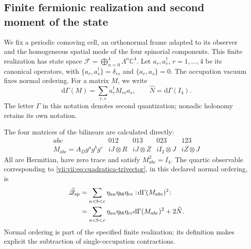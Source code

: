 \subsection{Finite fermionic realization and second moment of the state}
\label{vii:vii:subsec:segundo-momento-car}

We fix a periodic comoving cell, an orthonormal frame adapted to its
observer and the homogeneous spatial mode of the four spinorial
components. This finite realization has state space
\(\mathcal F=\bigoplus_{n=0}^4\Lambda^n\mathbb C^4\).
Let \(a_r,a_r^\dagger\), \(r=1,\ldots,4\) be its canonical
operators, with
\(\{a_r,a_s^\dagger\}=\delta_{rs}\) and
\(\{a_r,a_s\}=0\). The occupation vacuum fixes normal
ordering. For a matrix \(M\), we write
\[
 \mathrm d\Gamma(M)=\sum_{r,s}a_r^\dagger M_{rs}a_s,
 \qquad \widehat N=\mathrm d\Gamma(I_4).
\]
The letter \(\Gamma\) in this notation denotes second
quantization; nonadic holonomy retains its own notation.

The four matrices of the bilinears are calculated directly:
\begin{equation}
 \begin{array}{c|cccc}
 abc&012&013&023&123\\ \hline
 M_{abc}=A_Dg^ag^bg^c
       &iJ\otimes R&iJ\otimes Z&iI_2\otimes J&iZ\otimes J
 \end{array}
 \label{vii:vii:eq:matrices-bilineales-espin}
\end{equation}
All are Hermitian, have zero trace and satisfy
\(M_{abc}^2=I_4\). The quartic observable corresponding to
\eqref{vii:vii:eq:cuadratica-trivector}, in this declared normal ordering,
is
\begin{equation}
 \begin{split}
 \widehat{\mathscr Q}_{\rm sp}
 &=\sum_{a<b<c}\eta_{aa}\eta_{bb}\eta_{cc}
       :\!\mathrm d\Gamma(M_{abc})^2\!:\\
 &=\sum_{a<b<c}\eta_{aa}\eta_{bb}\eta_{cc}
       \mathrm d\Gamma(M_{abc})^2+2\widehat N.
 \end{split}
 \label{vii:vii:eq:observable-cuadratico-espin}
\end{equation}
Normal ordering is part of the specified finite realization;
its definition makes explicit the subtraction of single-occupation
contractions.

